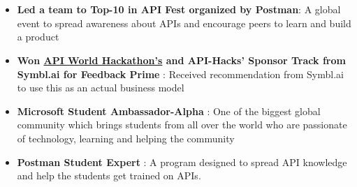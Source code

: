 \documentclass[letterpaper,11pt]{article}
\newcommand{\resumeItem}[1]{
  \item\small{
    {#1 \vspace{-2pt}}
  }
}
\newcommand{\resumeItemListStart}{\begin{itemize}}
\newcommand{\resumeItemListEnd}{\end{itemize}\vspace{-5pt}}
\begin{document}
\section{}
 \begin{itemize}[leftmargin=0.15in, label={}]
    \small{\item{
        \resumeItemListStart
                \resumeItem{\textbf{Led a team to {Top-10 in API Fest} organized by Postman}: A global event to spread awareness about APIs and encourage peers to learn and build a product}
                \resumeItem{\textbf{{Won \href{https://devpost.com/software/feedback-prime-kbg8um}{API World Hackathon's} and {API-Hacks'} Sponsor Track from Symbl.ai for Feedback Prime} }: Received recommendation from Symbl.ai to use this as an actual business model}
                \resumeItem{\textbf{{Microsoft Student Ambassador-Alpha}} : One of the biggest global community which brings students from all over the world who are passionate of technology, learning and helping the community }
                \resumeItem{\textbf{{ Postman Student Expert}} : A program designed to spread API knowledge and help the students get trained on APIs.}
      \resumeItemListEnd
    }}
 \end{itemize}
 
 
\end{document}
